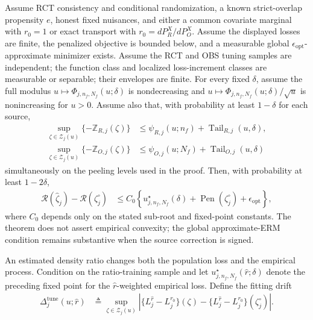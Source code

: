 \begin{theorem}
\label{thm:cate-general-localized}
Assume RCT consistency and conditional randomization, a known strict-overlap
propensity $e$, honest fixed nuisances, and either a common covariate
marginal with $r_0=1$ or exact transport with
$r_0=dP_R^X/dP_O^X$. Assume the displayed losses are finite, the penalized
objective is bounded below, and a measurable global
$\epsilon_{\mathrm{opt}}$-approximate minimizer exists. Assume the RCT and
OBS tuning samples are independent; the function class and
localized loss-increment classes are measurable or separable; their envelopes
are finite. For every fixed $\delta$, assume the full modulus
$u\mapsto\Phi_{j,n_f,N_f}(u;\delta)$ is nondecreasing and
$u\mapsto\Phi_{j,n_f,N_f}(u;\delta)/\sqrt{u}$ is nonincreasing for
$u>0$. Assume also that, with probability at least
$1-\delta$ for each source,
\begin{align*}
\sup_{\zeta\in\mathcal Z_j(u)}\{-\mathbb Z_{R,j}(\zeta)\}
&\leq\psi_{R,j}(u;n_f)+\operatorname{Tail}_{R,j}(u,\delta),\\
\sup_{\zeta\in\mathcal Z_j(u)}\{-\mathbb Z_{O,j}(\zeta)\}
&\leq\psi_{O,j}(u;N_f)+\operatorname{Tail}_{O,j}(u,\delta)
\end{align*}
simultaneously on the peeling levels used in the proof.  Then, with
probability at least $1-2\delta$,
\begin{align}
\mathcal R(\widehat\zeta_j)-\mathcal R(\zeta_j^\circ)
&\leq C_0\left\{
u_{j,n_f,N_f}^\star(\delta)
+\operatorname{Pen}(\zeta_j^\circ)
+\epsilon_{\mathrm{opt}}\right\},
\label{eq:cate-general-localized}
\end{align}
where $C_0$ depends only on the stated sub-root and fixed-point constants.
The theorem does not assert empirical convexity; the global approximate-ERM
condition remains substantive when the source correction is signed.
\end{theorem}

An estimated density ratio changes both the population loss and the empirical
process.  Condition on the ratio-training sample and let
$u_{j,n_f,N_f}^\star(\widehat r;\delta)$ denote the preceding fixed point
for the $\widehat r$-weighted empirical loss.  Define the fitting drift
\begin{align*}
\Delta_j^{\mathrm{tune}}(u;\widehat r)
&\triangleq
\sup_{\zeta\in\mathcal Z_j(u)}
\left|\{L_j^{\widehat r}-L_j^{r_0}\}(\zeta)
-\{L_j^{\widehat r}-L_j^{r_0}\}(\zeta_j^\circ)\right|.
\end{align*}

